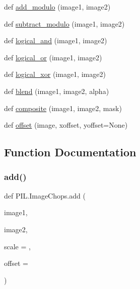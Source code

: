 \begin{DoxyCompactItemize}
\item 
def \hyperlink{namespacePIL_1_1ImageChops_aeaa07196844a79bde521e1e69c5838ea}{add\+\_\+modulo} (image1, image2)
\item 
def \hyperlink{namespacePIL_1_1ImageChops_a46edd6ee7a7c6f7f04d1582014326483}{subtract\+\_\+modulo} (image1, image2)
\item 
def \hyperlink{namespacePIL_1_1ImageChops_a54a0fe618f3d418f4bf71deadd5e0b39}{logical\+\_\+and} (image1, image2)
\item 
def \hyperlink{namespacePIL_1_1ImageChops_a4be1980482ad2366e9b55da5409e418e}{logical\+\_\+or} (image1, image2)
\item 
def \hyperlink{namespacePIL_1_1ImageChops_a67f21948c21172e1086590a0932ce160}{logical\+\_\+xor} (image1, image2)
\item 
def \hyperlink{namespacePIL_1_1ImageChops_aa43b4e6bb3096e8242768542e0c30c16}{blend} (image1, image2, alpha)
\item 
def \hyperlink{namespacePIL_1_1ImageChops_a92bc38d251b6fb8d2c87a284b3b500ed}{composite} (image1, image2, mask)
\item 
def \hyperlink{namespacePIL_1_1ImageChops_aecb249ce586c43bfc14ac7ca6accad58}{offset} (image, xoffset, yoffset=None)
\end{DoxyCompactItemize}


\subsection{Function Documentation}
\mbox{\label{namespacePIL_1_1ImageChops_a839755de44ce63c6a710b7f4831e0067}} 
\subsubsection{\texorpdfstring{add()}{add()}}
{\footnotesize\ttfamily def P\+I\+L.\+Image\+Chops.\+add (\begin{DoxyParamCaption}\item[{}]{image1,  }\item[{}]{image2,  }\item[{}]{scale = {},  }\item[{}]{offset = {} }\end{DoxyParamCaption})}

